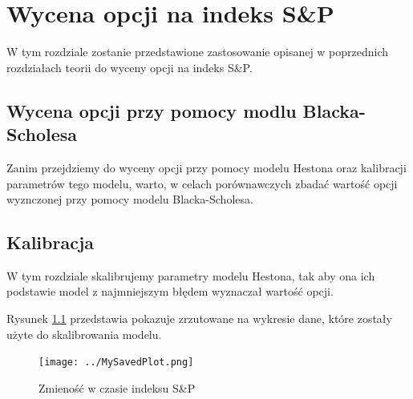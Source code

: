 \documentclass{pracamgr}
\begin{document}



\chapter{Wycena opcji na indeks S\&P}\label{r:sp}

W tym rozdziale zostanie przedstawione zastosowanie opisanej w poprzednich 
rozdziałach teorii do wyceny opcji na indeks S\&P. 

\section{Wycena opcji przy pomocy modlu Blacka-Scholesa}

Zanim przejdziemy do wyceny opcji  przy pomocy modelu Hestona oraz kalibracji
parametrów tego modelu, warto, w celach porównawczych zbadać wartość opcji 
wyznczonej przy pomocy modelu Blacka-Scholesa. 




\section{Kalibracja}

W tym rozdziale skalibrujemy parametry modelu Hestona, tak aby ona ich 
podstawie model z najmniejszym błędem wyznaczał wartość opcji.

Rysunek \ref{fig:data} przedstawia pokazuje zrzutowane na wykresie dane, które
zostały użyte do skalibrowania modelu.

\begin{figure}
  \centering
  \texttt{[image: ../MySavedPlot.png]}
  \caption{Zmieność w czasie indeksu S\&P}
  \label{fig:data}
\end{figure}
\end{document}
